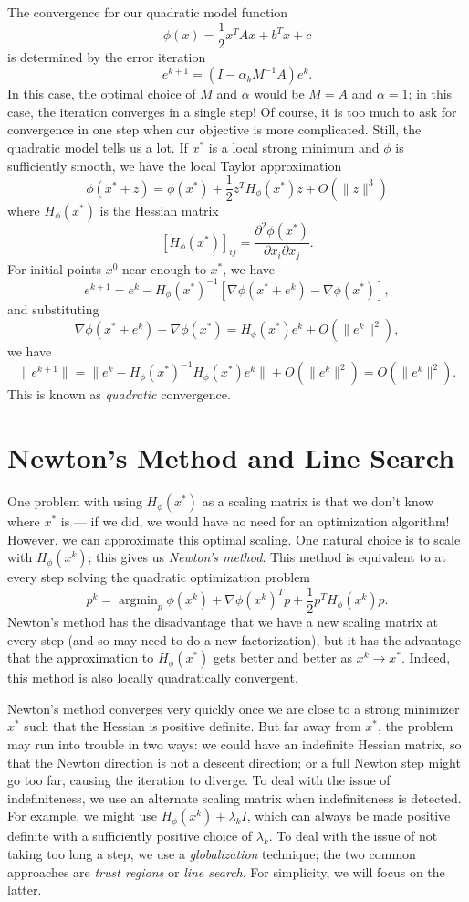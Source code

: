 \documentclass[12pt, leqno]{article} %
\begin{document}
The convergence for our quadratic model function
\[
  \phi(x) = \frac{1}{2} x^T A x + b^T x + c
\]
is determined by the error iteration
\[
  e^{k+1} = (I-\alpha_k M^{-1} A) e^k.
\]
In this case, the optimal choice of $M$ and $\alpha$ would be
$M = A$ and $\alpha = 1$; in this case, the iteration converges
in a single step!  Of course, it is too much to ask for convergence
in one step when our objective is more complicated.  Still, the
quadratic model tells us a lot.  If $x^*$
is a local strong minimum and $\phi$ is sufficiently smooth,
we have the local Taylor approximation
\[
  \phi(x^* + z) = \phi(x^*) + \frac{1}{2} z^T H_{\phi}(x^*) z + O(\|z\|^3)
\]
where $H_{\phi}(x^*)$ is the Hessian matrix
\[
  \left[ H_{\phi}(x^*) \right]_{ij} =
  \frac{\partial^2 \phi(x^*)}{\partial x_i \partial x_j}.
\]
For initial points $x^0$ near enough to $x^*$, we have
\[
  e^{k+1} = e^k - H_\phi(x^*)^{-1}
  \left[ \nabla \phi(x^* + e^k) - \nabla \phi(x^*) \right],
\]
and substituting
\[
  \nabla \phi(x^* + e^k) - \nabla \phi(x^*) =
  H_{\phi}(x^*) e^k + O(\|e^k\|^2),
\]
we have
\[
  \|e^{k+1}\|
  = \|e^k - H_{\phi}(x^*)^{-1} H_{\phi}(x^*) e^k\| + O(\|e^k\|^2)
  = O(\|e^k\|^2).
\]
This is known as {\em quadratic} convergence.

\section{Newton's Method and Line Search}

One problem with using $H_{\phi}(x^*)$ as a scaling matrix is that we
don't know where $x^*$ is --- if we did, we would have no need for an
optimization algorithm!  However, we can approximate this optimal
scaling.  One natural choice is to scale with $H_{\phi}(x^k)$;
this gives us {\em Newton's method}.  This method is equivalent
to at every step solving the quadratic optimization problem
\[
p^k = \operatorname{argmin}_p
\phi(x^k) + \nabla \phi(x^k)^T p + \frac{1}{2} p^T H_\phi(x^k) p.
\]
Newton's method has the disadvantage that we have a new scaling matrix
at every step (and so may need to do a new factorization), but it has
the advantage that the approximation to $H_{\phi}(x^*)$ gets better
and better as $x^k \rightarrow x^*$.  Indeed, this method is also
locally quadratically convergent.

Newton's method converges very quickly once we are close to a strong
minimizer $x^*$ such that the Hessian is positive definite.  But far
away from $x^*$, the problem may run into trouble in two ways: we
could have an indefinite Hessian matrix, so that the Newton direction
is not a descent direction; or a full Newton step might go too far,
causing the iteration to diverge.  To deal with the issue of
indefiniteness, we use an alternate scaling matrix when indefiniteness
is detected.  For example, we might use $H_{\phi}(x^k) + \lambda_k I$,
which can always be made positive definite with a sufficiently
positive choice of $\lambda_k$.  To deal with the issue of not taking
too long a step, we use a {\em globalization} technique; the two
common approaches are {\em trust regions} or {\em line search}.  For
simplicity, we will focus on the latter.
\end{document}
